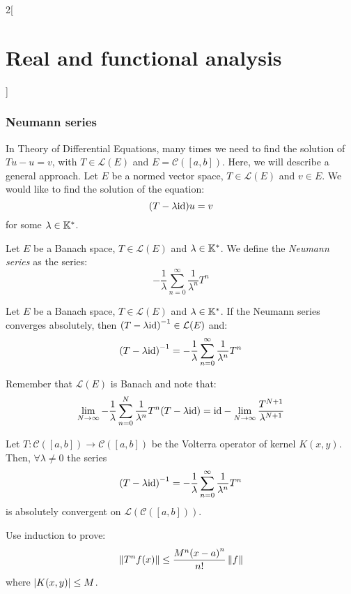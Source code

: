 \documentclass[../../../main_math.tex]{subfiles}
\begin{document}
\begin{multicols}{2}[\section{Real and functional analysis}]
  \subsubsection{Neumann series}
  \begin{remark}
    In Theory of Differential Equations, many times we need to find the solution of $Tu-u=v$, with $T\in\mathcal{L}(E)$ and $E=\mathcal{C}([a,b])$. Here, we will describe a general approach. Let $E$ be a normed vector space, $T\in\mathcal{L}(E)$ and $v\in E$. We would like to find the solution of the equation: $$(T-\lambda\mathrm{id})u=v$$ for some $\lambda\in\mathbb{K}^*$.
  \end{remark}
  \begin{definition}
    Let $E$ be a Banach space, $T\in\mathcal{L}(E)$ and $\lambda\in\mathbb{K}^*$. We define the \emph{Neumann series} as the series:
    $$-\frac{1}{\lambda}\sum_{n= 0}^\infty\frac{1}{\lambda^n}T^n$$
  \end{definition}
  \begin{theorem}
    Let $E$ be a Banach space, $T\in\mathcal{L}(E)$ and $\lambda\in\mathbb{K}^*$. If the Neumann series converges absolutely, then ${(T-\lambda\mathrm{id})}^{-1}\in\mathcal{L}(E)$ and: $${(T-\lambda\mathrm{id})}^{-1}=-\frac{1}{\lambda}\sum_{n= 0}^\infty\frac{1}{\lambda^n}T^n$$
  \end{theorem}
  \begin{sproof}
    Remember that $\mathcal{L}(E)$ is Banach and note that:
    $$\lim_{N\to\infty}-\frac{1}{\lambda}\sum_{n= 0}^N\frac{1}{\lambda^n}T^n(T-\lambda\mathrm{id})=\mathrm{id}-\lim_{N\to\infty}\frac{T^{N+1}}{\lambda^{N+1}}$$
  \end{sproof}
  \begin{theorem}
    Let $T:\mathcal{C}([a,b])\rightarrow\mathcal{C}([a,b])$ be the Volterra operator of kernel $K(x,y)$. Then, $\forall \lambda\ne 0$ the series
    $${(T-\lambda\mathrm{id})}^{-1}=-\frac{1}{\lambda}\sum_{n= 0}^\infty\frac{1}{\lambda^n}T^n$$
    is absolutely convergent on $\mathcal{L}(\mathcal{C}([a,b]))$.
  \end{theorem}
  \begin{sproof}
    Use induction to prove: $$\left\|T^nf(x)\right\|\leq \frac{M^n{(x-a)}^n}{n!}\left\|f\right\|$$
    where $\abs{K(x,y)}\leq M$.
  \end{sproof}

\end{multicols}
\end{document}
